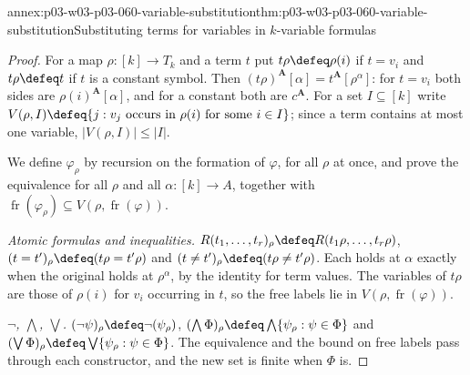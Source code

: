 \begin{annexitem}{annex:p03-w03-p03-060-variable-substitution}{thm:p03-w03-p03-060-variable-substitution}{Substituting terms for variables in \(k\)-variable formulas}
\begin{proof}
For a map \(\rho\colon[k]\to T_k\) and a term \(t\) put
\(t\rho\defeq\rho(i)\) if \(t=v_i\) and \(t\rho\defeq t\) if \(t\) is a
constant symbol. Then \((t\rho)^{\mathbf A}[\alpha]=t^{\mathbf A}[\rho^\alpha]\):
for \(t=v_i\) both sides are \(\rho(i)^{\mathbf A}[\alpha]\), and for a
constant both are \(c^{\mathbf A}\). For a set \(I\subseteq[k]\) write
\(V(\rho,I)\defeq\{j:v_j\text{ occurs in }\rho(i)\text{ for some }i\in I\}\);
since a term contains at most one variable, \(|V(\rho,I)|\le|I|\).

We define \(\varphi_\rho\) by recursion on the formation of \(\varphi\),
for all \(\rho\) at once, and prove the equivalence for all \(\rho\) and
all \(\alpha\colon[k]\to A\), together with
\(\operatorname{fr}(\varphi_\rho)\subseteq V(\rho,\operatorname{fr}(\varphi))\).

\emph{Atomic formulas and inequalities.}
\(R(t_1,\ldots,t_r)_\rho\defeq R(t_1\rho,\ldots,t_r\rho)\),
\((t=t')_\rho\defeq(t\rho=t'\rho)\) and
\((t\neq t')_\rho\defeq(t\rho\neq t'\rho)\). Each holds at \(\alpha\)
exactly when the original holds at \(\rho^\alpha\), by the identity for
term values. The variables of \(t\rho\) are those of \(\rho(i)\) for
\(v_i\) occurring in \(t\), so the free labels lie in
\(V(\rho,\operatorname{fr}(\varphi))\).

\emph{\(\neg\), \(\bigwedge\), \(\bigvee\).}
\((\neg\psi)_\rho\defeq\neg(\psi_\rho)\),
\((\bigwedge\Phi)_\rho\defeq\bigwedge\{\psi_\rho:\psi\in\Phi\}\) and
\((\bigvee\Phi)_\rho\defeq\bigvee\{\psi_\rho:\psi\in\Phi\}\). The
equivalence and the bound on free labels pass through each constructor,
and the new set is finite when \(\Phi\) is.


\end{proof}
\end{annexitem}
